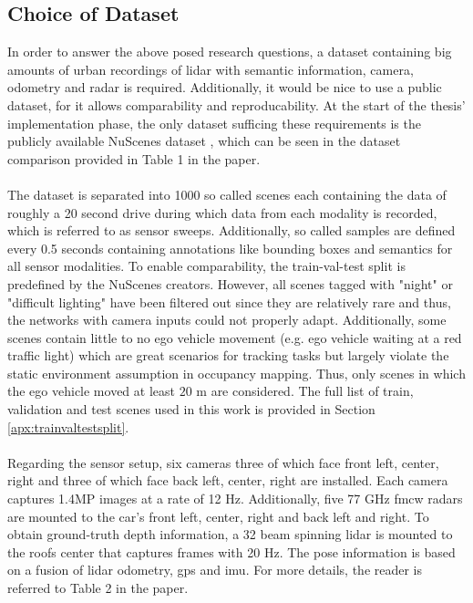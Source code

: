 \subsection{Choice of Dataset}
\label{subsec:choice_of_dataset}
In order to answer the above posed research questions, a dataset containing big amounts of urban recordings of lidar with semantic information, camera, odometry and radar is required. Additionally, it would be nice to use a public dataset, for it allows comparability and reproducability. At the start of the thesis' implementation phase, the only dataset sufficing these requirements is the publicly available NuScenes dataset \cite{caesar2020nuscenes}, which can be seen in the dataset comparison provided in Table 1 in the paper.
\\\\
The dataset is separated into 1000 so called scenes each containing the data of roughly a 20 second drive during which data from each modality is recorded, which is referred to as sensor sweeps. Additionally, so called samples are defined every 0.5 seconds containing annotations like bounding boxes and semantics for all sensor modalities. To enable comparability, the train-val-test split is predefined by the NuScenes creators. However, all scenes tagged with "night" or "difficult lighting" have been filtered out since they are relatively rare and thus, the networks with camera inputs could not properly adapt. Additionally, some scenes contain little to no ego vehicle movement (e.g. ego vehicle waiting at a red traffic light) which are great scenarios for tracking tasks but largely violate the static environment assumption in occupancy mapping. Thus, only scenes in which the ego vehicle moved at least $20$ m are considered. The full list of train, validation and test scenes used in this work is provided in Section \ref{apx:trainvaltestsplit}.
\\\\
Regarding the sensor setup, six cameras three of which face front left, center, right and three of which face back left, center, right are installed. Each camera captures 1.4MP images at a rate of 12 Hz. Additionally, five 77 GHz \gls{fmcw} radars are mounted to the car's front left, center, right and back left and right. To obtain ground-truth depth information, a 32 beam spinning lidar is mounted to the roofs center that captures frames with 20 Hz. The pose information is based on a fusion of lidar odometry, \gls{gps} and \gls{imu}.  For more details, the reader is referred to Table 2 in the paper.
%
